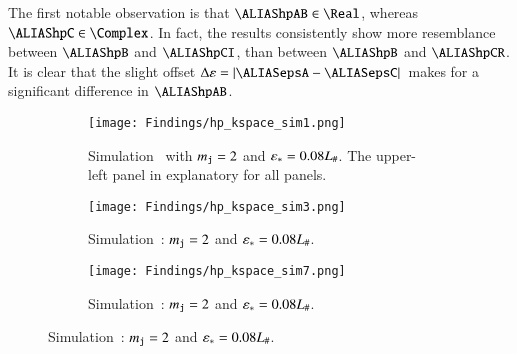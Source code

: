     The first notable observation is that $\hpAB\in \Real$, whereas $\hpC\in \Complex$. In fact, the results consistently show more resemblance between $\hpB$ and $\hpCI$, than between $\hpB$ and $\hpCR$. It is clear that the slight offset $\Delta \varepsilon = \abs*{\epsA-\epsC}$ makes for a significant difference in $\hpAB$. %
    \begin{figure}[hb!]
        \centering
        \begin{subfigure}[b]{\linewidth}
            \centering
            \texttt{[image: Findings/hp\_kspace\_sim1.png]}
        \caption{Simulation~ with $m_{\mathtt{j}}=2$ and $\varepsilon_\ast=0.08L_\#$. The upper-left panel in explanatory for all panels.}
        \label{fig:results:h11:hp_kspace_sim1}
        \end{subfigure}
        \hfill
        \begin{subfigure}[b]{\linewidth}
            \centering
            \texttt{[image: Findings/hp\_kspace\_sim3.png]}
        \caption{Simulation~: $m_{\mathtt{j}}=2$ and $\varepsilon_\ast=0.08L_\#$.}
        \label{fig:results:h11:hp_kspace_sim3}
        \end{subfigure}
        \hfill
        \begin{subfigure}[b]{\linewidth}
            \centering
            \texttt{[image: Findings/hp\_kspace\_sim7.png]}
        \caption{Simulation~: $m_{\mathtt{j}}=2$ and $\varepsilon_\ast=0.08L_\#$.}
        \label{fig:results:h11:hp_kspace_sim7}
        \end{subfigure}
    \end{figure}
